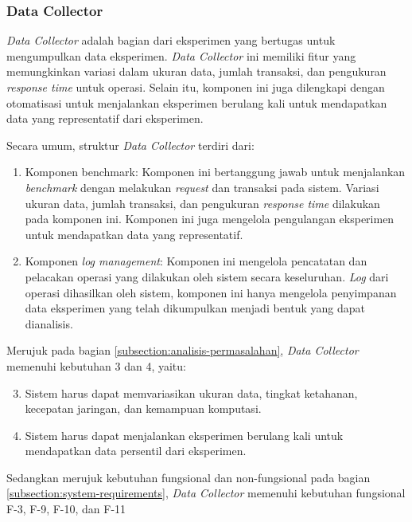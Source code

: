 \subsubsection{Data Collector}
\label{subsubsection:data-collector}

\textit{Data Collector} adalah bagian dari eksperimen yang bertugas untuk mengumpulkan data eksperimen. \textit{Data Collector} ini memiliki fitur yang memungkinkan variasi dalam ukuran data, jumlah transaksi, dan pengukuran \textit{response time} untuk operasi. Selain itu, komponen ini juga dilengkapi dengan otomatisasi untuk menjalankan eksperimen berulang kali untuk mendapatkan data yang representatif dari eksperimen.

Secara umum, struktur \textit{Data Collector} terdiri dari:

\begin{enumerate}
    \item Komponen benchmark: Komponen ini bertanggung jawab untuk menjalankan \textit{benchmark} dengan melakukan \textit{request} dan transaksi pada sistem. Variasi ukuran data, jumlah transaksi, dan pengukuran \textit{response time} dilakukan pada komponen ini. Komponen ini juga mengelola pengulangan eksperimen untuk mendapatkan data yang representatif.
    \item Komponen \textit{log management}: Komponen ini mengelola pencatatan dan pelacakan operasi yang dilakukan oleh sistem secara keseluruhan. \textit{Log} dari operasi dihasilkan oleh sistem, komponen ini hanya mengelola penyimpanan data eksperimen yang telah dikumpulkan menjadi bentuk yang dapat dianalisis.
\end{enumerate}

Merujuk pada bagian \ref{subsection:analisis-permasalahan}, \textit{Data Collector} memenuhi kebutuhan 3 dan 4, yaitu:

\begin{enumerate}
    \setcounter{enumi}{2}
    \item Sistem harus dapat memvariasikan ukuran data, tingkat ketahanan, kecepatan jaringan, dan kemampuan komputasi.
    \item Sistem harus dapat menjalankan eksperimen berulang kali untuk mendapatkan data persentil dari eksperimen.
\end{enumerate}

Sedangkan merujuk kebutuhan fungsional dan non-fungsional pada bagian \ref{subsection:system-requirements}, \textit{Data Collector} memenuhi kebutuhan fungsional F-3, F-9, F-10, dan F-11
